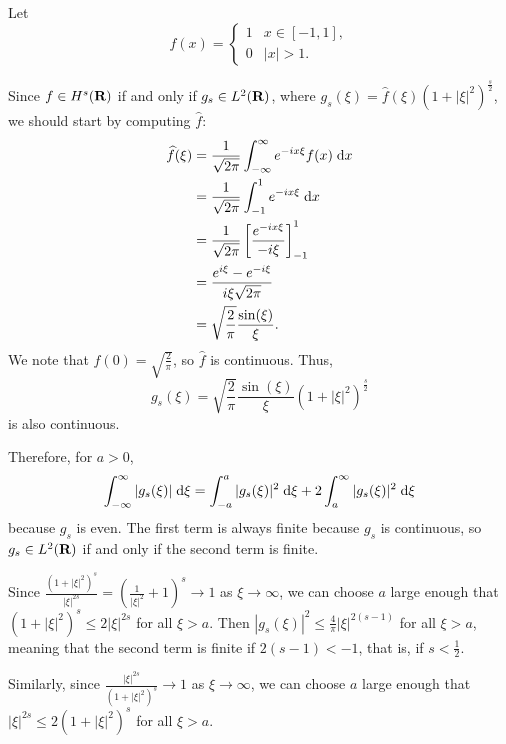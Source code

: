 \documentclass{homework}
\begin{document}
	\maketitle
	
	Let
	\begin{equation}
		f(x) = \begin{cases}
			1 & x \in [-1, 1], \\
			0 & |x| > 1.
		\end{cases}
	\end{equation}
	
	\question Since $f \in H^s(\textnormal{\bf R})$ if and only if $g_s \in L^2(\textnormal{\bf R})$, where $g_s(\xi) = \widehat{f}(\xi)(1+|\xi|^2)^\frac{s}{2}$, we should start by computing $\widehat{f}$:
	\begin{align*}
		\widehat{f}(\xi) &= \frac{1}{\sqrt{2\pi}} \int_{-\infty}^\infty e^{-ix\xi}f(x)\;\text{d} x \\
		&= \frac{1}{\sqrt{2\pi}}\int_{-1}^1 e^{-ix\xi}\;\text{d} x \\
		&= \frac{1}{\sqrt{2\pi}}\left[\frac{e^{-ix\xi}}{-i\xi}\right]_{-1}^1 \\
		&= \frac{e^{i\xi} - e^{-i\xi}}{i\xi\sqrt{2\pi}}\\
		&= \sqrt{\frac{2}{\pi}}\frac{\sin(\xi)}{\xi}.
	\end{align*}
	We note that $\widehat{f}(0) = \sqrt{\frac{2}{\pi}}$, so $\widehat{f}$ is continuous. Thus,
	\begin{equation*}
		g_s(\xi) =\sqrt{\frac{2}{\pi}}\frac{\sin(\xi)}{\xi}(1+|\xi|^2)^\frac{s}{2}
	\end{equation*}
	is also continuous.
	
	Therefore, for $a > 0$,
	\begin{equation*}
		\int_{-\infty}^\infty |g_s(\xi)|\;\text{d}\xi = \int_{-a}^a |g_s(\xi)|^2\;\text{d}\xi + 2\int_{a}^\infty |g_s(\xi)|^2\;\text{d} \xi
	\end{equation*}
	because $g_s$ is even. The first term is always finite because $g_s$ is continuous, so $g_s \in L^2(\textnormal{\bf R})$ if and only if the second term is finite.
	
	Since $\frac{(1+|\xi|^2)^s}{|\xi|^{2s}} = \left(\frac{1}{|\xi|^2} + 1\right)^s \to 1$ as $\xi \to \infty$, we can choose $a$ large enough that $(1+|\xi|^2)^s \le 2|\xi|^{2s}$ for all $\xi > a$. Then $|g_s(\xi)|^2 \le \frac{4}{\pi}|\xi|^{2(s-1)}$ for all $\xi > a$, meaning that the second term is finite if $2(s-1) < -1$, that is, if $s < \frac{1}{2}$.
	
	Similarly, since $\frac{|\xi|^{2s}}{(1+|\xi|^2)^s} \to 1$ as $\xi \to \infty$, we can choose $a$ large enough that $|\xi|^{2s} \le 2(1+|\xi|^2)^s$ for all $\xi > a$. 
	
\end{document}
